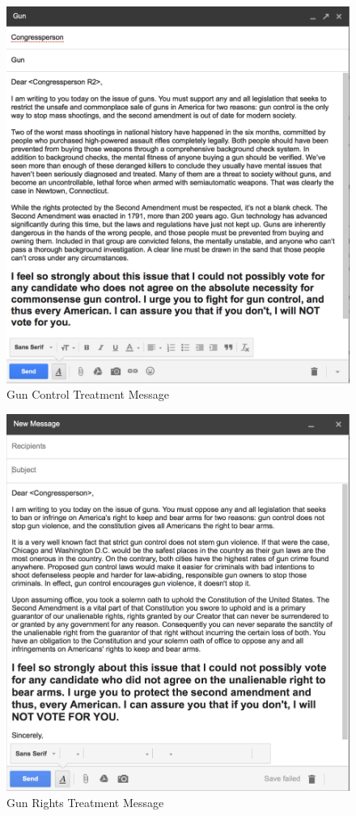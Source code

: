 \documentclass[12pt]{article}\usepackage[]{graphicx}\usepackage[]{color}
\begin{document}
\begin{figure}[h!]
	\caption{Gun Control Treatment Message}
	\includegraphics[width=\textwidth]{gun_control.png}
\end{figure}

\begin{figure}[h!]
	\caption{Gun Rights Treatment Message}
	\includegraphics[width=\textwidth]{gun_rights.png}
\end{figure}
\end{document}
